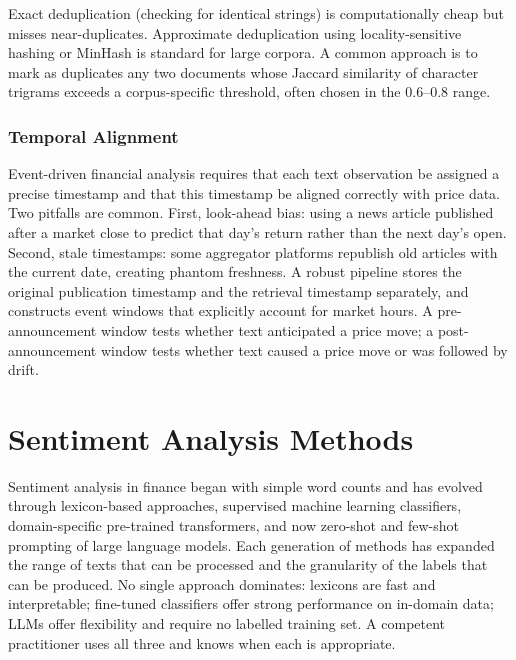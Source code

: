 Exact deduplication (checking for identical strings) is computationally cheap but misses near-duplicates. Approximate deduplication using locality-sensitive hashing or MinHash is standard for large corpora. A common approach is to mark as duplicates any two documents whose Jaccard similarity of character trigrams exceeds a corpus-specific threshold, often chosen in the 0.6--0.8 range.

\subsubsection*{Temporal Alignment}

Event-driven financial analysis requires that each text observation be assigned a precise timestamp and that this timestamp be aligned correctly with price data. Two pitfalls are common. First, look-ahead bias: using a news article published after a market close to predict that day's return rather than the next day's open. Second, stale timestamps: some aggregator platforms republish old articles with the current date, creating phantom freshness. A robust pipeline stores the original publication timestamp and the retrieval timestamp separately, and constructs event windows that explicitly account for market hours. A pre-announcement window tests whether text anticipated a price move; a post-announcement window tests whether text caused a price move or was followed by drift.

\section{Sentiment Analysis Methods}
\label{sec:ch09-sentiment-analysis-methods}

\begin{context}

Sentiment analysis in finance began with simple word counts and has evolved through lexicon-based approaches, supervised machine learning classifiers, domain-specific pre-trained transformers, and now zero-shot and few-shot prompting of large language models. Each generation of methods has expanded the range of texts that can be processed and the granularity of the labels that can be produced. No single approach dominates: lexicons are fast and interpretable; fine-tuned classifiers offer strong performance on in-domain data; LLMs offer flexibility and require no labelled training set. A competent practitioner uses all three and knows when each is appropriate.

\end{context}

